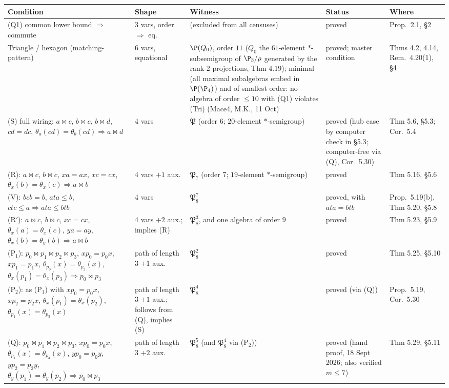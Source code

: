 \begin{table}[htbp]
\centering\small
\begin{tabular}{@{}llllp{4.2cm}@{}}
\toprule
Condition & Shape & Witness\footnotemark & Status & Where \\
\midrule
(Q1) common lower bound $\Rightarrow$ commute & 3 vars, order $\Rightarrow$ eq. & (excluded from all censuses) & proved & Prop.~2.1, \S2 \\
Triangle / hexagon (matching-pattern) & 6 vars, equational & $\P(Q_0)$, order $11$ ($Q_0$ the $61$-element $*$-subsemigroup of $\P_3/\rho$ generated by the rank-$2$ projections, Thm 4.19); minimal (all maximal subalgebras embed in $\P(\P_4)$) and of smallest order: no algebra of order $\le10$ with (Q1) violates (Tri) (Mace4, M.K., 11 Oct) & proved; master condition & Thms 4.2, 4.14, Rem.\ 4.20(1), \S4 \\
(S) full wiring: $a\bowtie c$, $b\bowtie c$, $b\bowtie d$, $cd=dc$, $\theta_a(cd)=\theta_b(cd)\Rightarrow a\bowtie d$ & 4 vars & $\mathfrak P$ (order 6; $20$-element $*$-semigroup) & proved (hub case by computer check in \S5.3; computer-free via (Q), Cor.\ 5.30) & Thm 5.6, \S5.3; Cor.\ 5.4 \\
(R): $a\bowtie c$, $b\bowtie c$, $xa=ax$, $xc=cx$, $\theta_x(b)=\theta_x(c)\Rightarrow a\bowtie b$ & 4 vars $+1$ aux. & $\mathfrak P_7$ (order 7; $19$-element $*$-semigroup) & proved & Thm 5.16, \S5.6 \\
(V): $bcb=b$, $ata\le b$, $ctc\le a\Rightarrow ata\le btb$ & 4 vars & $\mathfrak P_8^7$ & proved, with $ata=btb$ & Prop.\ 5.19(b), Thm 5.20, \S5.8 \\
(R$'$): $a\bowtie c$, $b\bowtie c$, $xc=cx$, $\theta_x(a)=\theta_x(c)$, $ya=ay$, $\theta_x(b)=\theta_y(b)\Rightarrow a\bowtie b$ & 4 vars $+2$ aux.; implies (R) & $\mathfrak P_8^3$, and one algebra of order $9$ & proved & Thm 5.23, \S5.9 \\
(P$_1$): $p_0\bowtie p_1\bowtie p_2\bowtie p_3$, $xp_0=p_0x$, $xp_1=p_1x$, $\theta_{p_0}(x)=\theta_{p_2}(x)$, $\theta_x(p_1)=\theta_x(p_3)\Rightarrow p_0\bowtie p_3$ & path of length 3 $+1$ aux. & $\mathfrak P_8^2$ & proved & Thm 5.25, \S5.10 \\
(P$_2$): as (P$_1$) with $xp_0=p_0x$, $xp_2=p_2x$, $\theta_x(p_1)=\theta_x(p_2)$, $\theta_{p_1}(x)=\theta_{p_3}(x)$ & path of length 3 $+1$ aux.; follows from (Q), implies (S) & $\mathfrak P_8^4$ & proved (via (Q)) & Prop.\ 5.19, Cor.\ 5.30 \\
(Q): $p_0\bowtie p_1\bowtie p_2\bowtie p_3$, $xp_0=p_0x$, $\theta_{p_1}(x)=\theta_{p_3}(x)$, $yp_0=p_0y$, $yp_2=p_2y$, $\theta_y(p_1)=\theta_y(p_2)\Rightarrow p_0\bowtie p_3$ & path of length 3 $+2$ aux. & $\mathfrak P_8^5$ (and $\mathfrak P_8^4$ via (P$_2$)) & proved (hand proof, 18 Sept 2026; also verified $m\le7$) & Thm 5.29, \S5.11 \\

\end{tabular}
\end{table}
